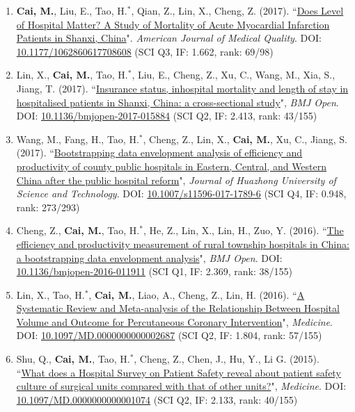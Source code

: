 \documentclass[11pt, a4paper]{article}
\newcommand{\years}[1]{\marginnote{\scriptsize #1}}
\begin{document}
\begin{enumerate}[leftmargin=0ex,itemsep=1ex]
		\item \years{2017}\textcolor{RubineRed}{\textbf{Cai, M.}}, Liu, E., Tao, H.$^\ast$, Qian, Z., Lin, X., Cheng, Z. (2017). ``\ul{Does Level of Hospital Matter? A Study of Mortality of Acute Myocardial Infarction Patients in Shanxi, China}". \emph{American Journal of Medical Quality}. DOI: \href{https://doi.org/10.1177/1062860617708608}{10.1177/1062860617708608} (SCI Q3, IF: 1.662, rank: 69/98)
		
		\item Lin, X., \textbf{Cai, M.}, Tao, H.$^\ast$, Liu, E., Cheng, Z., Xu, C., Wang, M., Xia, S., Jiang, T. (2017). ``\ul{Insurance status, inhospital mortality and length of stay in hospitalised patients in Shanxi, China: a cross-sectional study}", \emph{BMJ Open}. DOI: \href{https://doi.org/10.1136/bmjopen-2017-015884}{10.1136/bmjopen-2017-015884} (SCI Q2, IF: 2.413, rank: 43/155)
		
		\item Wang, M., Fang, H., Tao, H.$^\ast$, Cheng, Z., Lin, X., \textbf{Cai, M.}, Xu, C., Jiang, S. (2017). ``\ul{Bootstrapping data envelopment analysis of efficiency and productivity of county public hospitals in Eastern, Central, and Western China after the public hospital reform}", \emph{Journal of Huazhong University of Science and Technology}. DOI: \href{https://doi.org/10.1007/s11596-017-1789-6}{10.1007/s11596-017-1789-6} (SCI Q4, IF: 0.948, rank: 273/293)
		
		\item \years{2016}Cheng, Z., \textbf{Cai, M.}, Tao, H.$^\ast$, He, Z., Lin, X., Lin, H., Zuo, Y. (2016). ``\ul{The efficiency and productivity measurement of rural township hospitals in China: a bootstrapping data envelopment analysis}", \emph{BMJ Open}. DOI: \href{https://doi.org/10.1136/bmjopen-2016-011911}{10.1136/bmjopen-2016-011911} (SCI Q1, IF: 2.369, rank: 38/155)
		
		\item Lin, X., Tao, H.$^\ast$, \textbf{Cai, M.}, Liao, A., Cheng, Z., Lin, H. (2016). ``\ul{A Systematic Review and Meta-analysis of the Relationship Between Hospital Volume and Outcome for Percutaneous Coronary Intervention}", \emph{Medicine}. DOI: \href{https://doi.org/10.1097/MD.0000000000002687}{10.1097/MD.0000000000002687} (SCI Q2, IF: 1.804, rank: 57/155)
		
		\item \years{2015}Shu, Q., \textbf{Cai, M.}, Tao, H.$^\ast$, Cheng, Z., Chen, J., Hu, Y., Li G. (2015). ``\ul{What does a Hospital Survey on Patient Safety reveal about patient safety culture of surgical units compared with that of other units?}", \emph{Medicine}. DOI: \href{https://doi.org/10.1097/MD.0000000000001074}{10.1097/MD.0000000000001074} (SCI Q2, IF: 2.133, rank: 40/155)
		

\end{enumerate}
\end{document}
